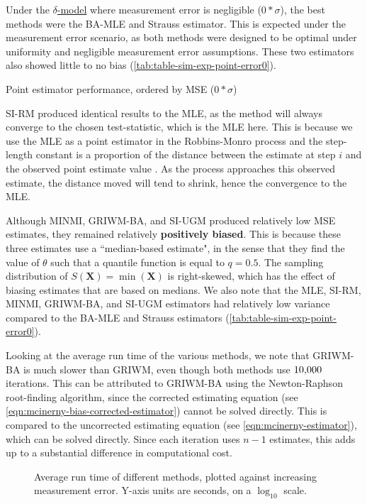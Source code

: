 Under the \hyperref[model: no-measurement-error]{$\delta$-model} where measurement error is negligible ($0*\sigma$), the best methods were the BA-MLE and Strauss estimator. This is expected under the measurement error scenario, as both methods were designed to be optimal under uniformity and negligible measurement error assumptions. These two estimators also showed little to no bias (\autoref{tab:table-sim-exp-point-error0}). 
\begin{table}[ht]
    \centering
    \caption{Point estimator performance, ordered by MSE ($0*\sigma$)}
    
    \label{tab:table-sim-exp-point-error0}
\end{table}

SI-RM produced identical results to the MLE, as the method will always converge to the chosen test-statistic, which is the MLE here. This is because we use the MLE as a point estimator in the Robbins-Monro process and the step-length constant is a proportion of the distance between the estimate at step $i$ and the observed point estimate value \cite{Garthwaite1992}. As the process approaches this observed estimate, the distance moved will tend to shrink, hence the convergence to the MLE.

Although MINMI, GRIWM-BA, and SI-UGM produced relatively low MSE estimates, they remained relatively \textbf{positively biased}. This is because these three estimates use a ``median-based estimate", in the sense that they find the value of $\theta$ such that a quantile function is equal to $q = 0.5$. The sampling distribution of $S(\bm{X}) = \min(\bm{X})$ is right-skewed, which has the effect of biasing estimates that are based on medians. We also note that the MLE, SI-RM, MINMI, GRIWM-BA, and SI-UGM estimators had relatively low variance compared to the BA-MLE and Strauss estimators (\autoref{tab:table-sim-exp-point-error0}).

Looking at the average run time of the various methods, we note that GRIWM-BA is much slower than GRIWM, even though both methods use $10{\small,}000$ iterations. This can be attributed to GRIWM-BA using the Newton-Raphson root-finding algorithm, since the corrected \citet{Mcinerny2006} estimating equation (see \autoref{eqn:mcinerny-bias-corrected-estimator}) cannot be solved directly. This is compared to the uncorrected estimating equation (see \autoref{eqn:mcinerny-estimator}), which can be solved directly. Since each iteration uses $n-1$ \citet{Mcinerny2006} estimates, this adds up to a substantial difference in computational cost.
\begin{figure}[ht]
    \centering
    
    \caption{Average run time of different methods, plotted against increasing measurement error. Y-axis units are seconds, on a $\log_{10}$ scale.}
    \label{fig:sim-exp-runtime-chart}
\end{figure}

